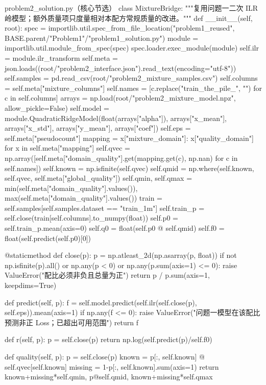 \documentclass[bwprint]{gmcmthesis}
\numberwithin{equation}{section}
\numberwithin{figure}{section}
\numberwithin{table}{section}
\begin{document}
\begin{appendices}
\begin{Python}{problem2\_solution.py（核心节选）}
class MixtureBridge:
    """复用问题一二次 ILR 岭模型；额外质量项只度量相对本配方常规质量的改进。"""
    def __init__(self, root):
        spec = importlib.util.spec_from_file_location("problem1_reused", BASE.parent/"Problem1"/"problem1_solution.py")
        module = importlib.util.module_from_spec(spec)
        spec.loader.exec_module(module)
        self.ilr = module.ilr_transform
        self.meta = json.loads((root/"problem2_interface.json").read_text(encoding="utf-8"))
        self.samples = pd.read_csv(root/"problem2_mixture_samples.csv")
        self.columns = self.meta["mixture_columns"]
        self.names = [c.replace("train_the_pile_", "") for c in self.columns]
        arrays = np.load(root/"problem2_mixture_model.npz", allow_pickle=False)
        self.model = module.QuadraticRidgeModel(float(arrays["alpha"]), arrays["x_mean"], arrays["x_std"], arrays["y_mean"], arrays["coef"])
        self.eps = self.meta["pseudocount"]
        mapping = {x["mixture_domain"]: x["quality_domain"] for x in self.meta["mapping"]}
        self.qvec = np.array([self.meta["domain_quality"].get(mapping.get(c), np.nan) for c in self.names])
        self.known = np.isfinite(self.qvec)
        self.qmid = np.where(self.known, self.qvec, self.meta["global_quality"])
        self.qmin, self.qmax = min(self.meta["domain_quality"].values()), max(self.meta["domain_quality"].values())
        train = self.samples[self.samples.dataset == "train_1m"]
        self.train_p = self.close(train[self.columns].to_numpy(float))
        self.p0 = self.train_p.mean(axis=0)
        self.q0 = float(self.p0 @ self.qmid)
        self.f0 = float(self.predict(self.p0)[0])

    @staticmethod
    def close(p):
        p = np.atleast_2d(np.asarray(p, float))
        if not np.isfinite(p).all() or np.any(p < 0) or np.any(p.sum(axis=1) <= 0):
            raise ValueError("配比必须非负且总量为正")
        return p / p.sum(axis=1, keepdims=True)

    def predict(self, p):
        f = self.model.predict(self.ilr(self.close(p), self.eps)).mean(axis=1)
        if np.any(f <= 0):
            raise ValueError("问题一模型在该配比预测非正 Loss；已超出可用范围")
        return f

    def r(self, p):
        p = self.close(p)
        return np.log(self.predict(p)/self.f0)

    def quality(self, p):
        p = self.close(p)
        known = p[:, self.known] @ self.qvec[self.known]
        missing = 1-p[:, self.known].sum(axis=1)
        return known+missing*self.qmin, p@self.qmid, known+missing*self.qmax


\end{Python}
\end{appendices}
\end{document}
